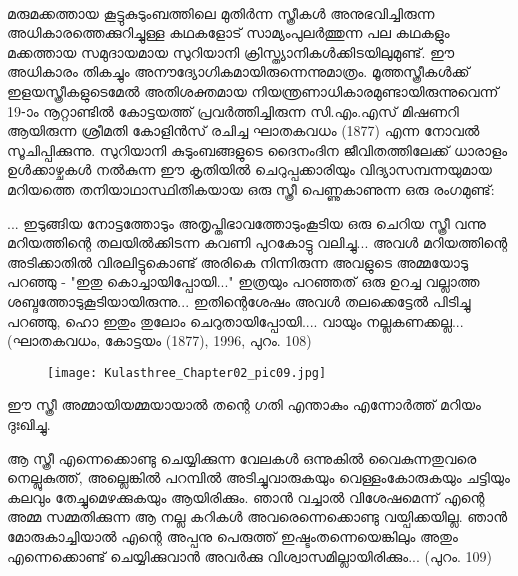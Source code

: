 \paragraph{}മരുമക്കത്തായ കൂട്ടുകുടുംബത്തിലെ മുതിർന്ന സ്ത്രീകൾ അനുഭവിച്ചിരുന്ന അധികാരത്തെക്കുറിച്ചുള്ള കഥകളോട് സാമ്യംപുലർത്തുന്ന പല കഥകളും മക്കത്തായ സമുദായമായ സുറിയാനി ക്രിസ്ത്യാനികൾക്കിടയിലുമുണ്ട്. ഈ അധികാരം തികച്ചും അനൗദ്യോഗികമായിരുന്നെന്നുമാത്രം. മൂത്തസ്ത്രീകൾക്ക് ഇളയസ്ത്രീകളുടെമേൽ അതിശക്തമായ നിയന്ത്രണാധികാരമുണ്ടായിരുന്നുവെന്ന് 19-ാം നൂറ്റാണ്ടിൽ കോട്ടയത്ത് പ്രവർത്തിച്ചിരുന്ന സി.എം.എസ് മിഷണറി ആയിരുന്ന ശ്രീമതി കോളിൻസ് രചിച്ച ഘാതകവധം (1877) എന്ന നോവൽ സൂചിപ്പിക്കുന്നു. സുറിയാനി കുടുംബങ്ങളുടെ ദൈനംദിന ജീവിതത്തിലേക്ക് ധാരാളം ഉൾക്കാഴ്ചകൾ നൽകുന്ന ഈ കൃതിയിൽ ചെറുപ്പക്കാരിയും വിദ്യാസമ്പന്നയുമായ മറിയത്തെ തനിയാഥാസ്ഥിതികയായ ഒരു സ്ത്രീ പെണ്ണുകാണുന്ന ഒരു രംഗമുണ്ട്:
\begin{tcolorbox}{}
... ഇടുങ്ങിയ നോട്ടത്തോടും അതൃപ്തിഭാവത്തോടുംകൂടിയ ഒരു ചെറിയ സ്ത്രീ വന്നു മറിയത്തിന്റെ തലയിൽക്കിടന്ന കവണി പുറകോട്ടു വലിച്ചു... അവൾ മറിയത്തിന്റെ അടിക്കാതിൽ വിരലിട്ടുകൊണ്ട് അരികെ നിന്നിരുന്ന അവളുടെ അമ്മയോടു പറഞ്ഞു - "ഇതു കൊച്ചായിപ്പോയി..." ഇത്രയും പറഞ്ഞത് ഒരു ഉറച്ച വല്ലാത്ത ശബ്ദത്തോടുകൂടിയായിരുന്നു... ഇതിന്റെശേഷം അവൾ തലക്കെട്ടേൽ പിടിച്ചു പറഞ്ഞു, ഹൊ ഇതും തുലോം ചെറുതായിപ്പോയി.... വായും നല്ലകണക്കല്ല...
(ഘാതകവധം, കോട്ടയം (1877), 1996, പുറം. 108)
\end{tcolorbox}{}
\begin{figure}[h]
\begin{center}
\texttt{[image: Kulasthree\_Chapter02\_pic09.jpg]}
\end{center}
\end{figure}


ഈ സ്ത്രീ അമ്മായിയമ്മയായാൽ തന്റെ ഗതി എന്താകും എന്നോർത്ത് മറിയം ദുഃഖിച്ചു.
\begin{tcolorbox}{}
ആ സ്ത്രീ എന്നെക്കൊണ്ടു ചെയ്യിക്കുന്ന വേലകൾ ഒന്നുകിൽ വൈകുന്നതുവരെ നെല്ലുകുത്ത്, അല്ലെങ്കിൽ പറമ്പിൽ അടിച്ചുവാരുകയും വെള്ളംകോരുകയും ചട്ടിയും കലവും തേച്ചുമെഴക്കുകയും ആയിരിക്കും. ഞാൻ വച്ചാൽ വിശേഷമെന്ന് എന്റെ അമ്മ സമ്മതിക്കുന്ന ആ നല്ല കറികൾ അവരെന്നെക്കൊണ്ടു വയ്പിക്കയില്ല. ഞാൻ മോരുകാച്ചിയാൽ എന്റെ അപ്പനു പെരുത്ത് ഇഷ്ടംതന്നെയെങ്കിലും അതും എന്നെക്കൊണ്ട് ചെയ്യിക്കുവാൻ അവർക്കു വിശ്വാസമില്ലായിരിക്കും... (പുറം. 109)
\end{tcolorbox}

